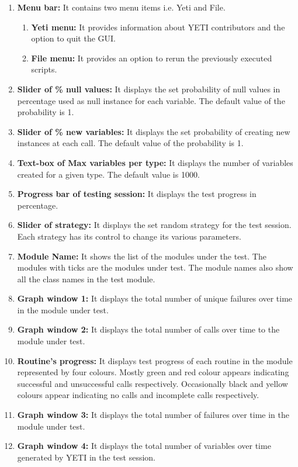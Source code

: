 \begin{enumerate}

\item \textbf{Menu bar:} It contains two menu items i.e. Yeti and File.
\begin{enumerate}
\item \textbf{Yeti menu:} It provides information about YETI contributors and the option to quit the GUI.
\item \textbf{File menu:} It provides an option to rerun the previously executed scripts.
\end{enumerate}
\item \textbf{Slider of \% null values:} It displays the set probability of null values in percentage used as null instance for each variable. The default value of the probability is 1. 
\item \textbf{Slider of \% new variables:} It displays the set probability of creating new instances at each call. The default value of the probability is 1. 
\item \textbf{Text-box of Max variables per type:} It displays the number of variables created for a given type. The default value is 1000.
\item \textbf{Progress bar of testing session:} It displays the test progress in percentage.
\item \textbf{Slider of strategy:} It displays the set random strategy for the test session. Each strategy has its control to change its various parameters. 
\item \textbf{Module Name:} It shows the list of the modules under the test. The
modules with ticks are the modules under test. The module names also show all the
class names in the test module.
\item \textbf{Graph window 1:} It displays the total number of unique failures over time in the module under test.
\item \textbf{Graph window 2:} It displays the total number of calls over time to the module under test.
\item \textbf{Routine's progress:} It displays test progress of each routine in the module represented by four colours. Mostly green and red colour appears indicating successful and unsuccessful calls respectively. Occasionally black and yellow colours appear indicating no calls and incomplete calls respectively.
\item \textbf{Graph window 3:} It displays the total number of failures over time in the module under test. 
\item \textbf{Graph window 4:} It displays the total number of variables over time generated by YETI in the test session.

\end{enumerate}
